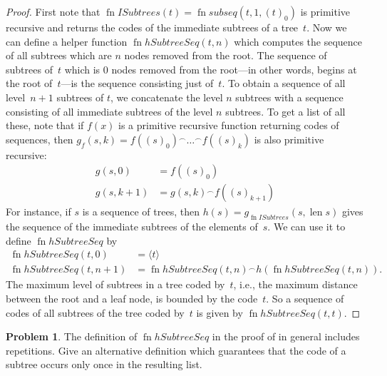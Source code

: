 \documentclass[10pt,a4paper]{article}
\makeatletter
\theoremstyle{plain}
\theoremstyle{definition}
\newtheorem{prob}{Problem}[section]
\theoremstyle{remark}
\newcommand{\olref}{\@ifnextchar[{\olref@i}{\olref@final}}
\def\olref@i[#1]{\@ifnextchar[{\olref@ii}{\olref@final}}
\def\olref@ii[#1]{\@ifnextchar[{\olref@iii}{\olref@final}}
\def\olref@iii[#1]{\olref@final}
\def\olref@final#1{\ref{#1}}
\providecommand{\tuple}[1]{\langle #1 \rangle}
\providecommand{\len}{\operatorname{len}}
\providecommand{\concat}{\mathbin{{}^\frown}}
\providecommand{\fn}{\operatorname{fn}}
\providecommand{\fn}{\operatorname{fn}}
\makeatother
\begin{document}
\begin{proof}
  First note that $\fn{ISubtrees}(t) = \fn{subseq}(t, 1, (t)_0)$ is
  primitive recursive and returns the codes of the immediate subtrees
  of a tree~$t$. Now we can define a helper function
  $\fn{hSubtreeSeq}(t,n)$ which computes the sequence of all subtrees
  which are $n$ nodes removed from the root. The sequence of subtrees
  of~$t$ which is $0$ nodes removed from the root---in other words,
  begins at the root of~$t$---is the sequence consisting just
  of~$t$. To obtain a sequence of all level~$n+1$ subtrees of $t$, we
  concatenate the level $n$ subtrees with a sequence consisting of all
  immediate subtrees of the level $n$ subtrees. To get a list of all
  these, note that if $f(x)$ is a primitive recursive function
  returning codes of sequences, then $g_f(s, k) = f((s)_0) \concat
  \dots \concat f((s)_k)$ is also primitive recursive:
    \begin{align*}
      g(s, 0) & = f((s)_0)\\
      g(s, k+1) & = g(s, k) \concat f((s)_{k+1})
    \end{align*}
    For instance, if $s$ is a sequence of trees, then
    $h(s) = g_{\fn{ISubtrees}}(s, \len{s})$ gives the sequence of the
    immediate subtrees of the elements of~$s$. We can use it to define
    $\fn{hSubtreeSeq}$ by
    \begin{align*}
      \fn{hSubtreeSeq}(t, 0) & = \tuple{t} \\
      \fn{hSubtreeSeq}(t, n+1) & = \fn{hSubtreeSeq}(t, n) \concat
      h(\fn{hSubtreeSeq}(t, n)).
    \end{align*}
    The maximum level of subtrees in a tree coded by~$t$, i.e., the
    maximum distance between the root and a leaf node, is bounded by
    the code~$t$. So a sequence of codes of all subtrees of the tree
    coded by~$t$ is given by $\fn{hSubtreeSeq}(t, t)$.
\end{proof}

\begin{prob}
  The definition of $\fn{hSubtreeSeq}$ in the proof of
  \olref[cmp][rec][tre]{prop:subtreeseq} in general includes
  repetitions. Give an alternative definition which guarantees that
  the code of a subtree occurs only once in the resulting list.
\end{prob}
\end{document}
